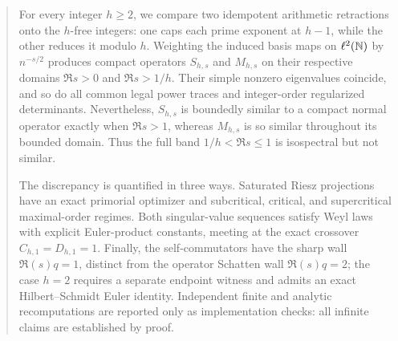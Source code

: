 \begin{abstract}
For every integer $h\ge2$, we compare two idempotent arithmetic
retractions onto the $h$-free integers: one caps each prime exponent at
$h-1$, while the other reduces it modulo $h$.  Weighting the induced basis
maps on $\ell^2(\N)$ by $n^{-s/2}$ produces compact operators
$S_{h,s}$ and $M_{h,s}$ on their respective domains
$\Re s>0$ and $\Re s>1/h$.  Their simple nonzero eigenvalues coincide,
and so do all common legal power traces and integer-order regularized
determinants.  Nevertheless, $S_{h,s}$ is boundedly similar to a compact
normal operator exactly when $\Re s>1$, whereas $M_{h,s}$ is so similar
throughout its bounded domain.  Thus the full band
$1/h<\Re s\le1$ is isospectral but not similar.

The discrepancy is quantified in three ways.  Saturated Riesz projections
have an exact primorial optimizer and subcritical, critical, and
supercritical maximal-order regimes.  Both singular-value sequences satisfy
Weyl laws with explicit Euler-product constants, meeting at the exact
crossover $C_{h,1}=D_{h,1}=1$.  Finally, the self-commutators have the sharp
wall $\Re(s)q=1$, distinct from the operator Schatten wall
$\Re(s)q=2$; the case $h=2$ requires a separate endpoint witness and admits
an exact Hilbert--Schmidt Euler identity.  Independent finite and analytic
recomputations are reported only as implementation checks: all infinite
claims are established by proof.
\end{abstract}

